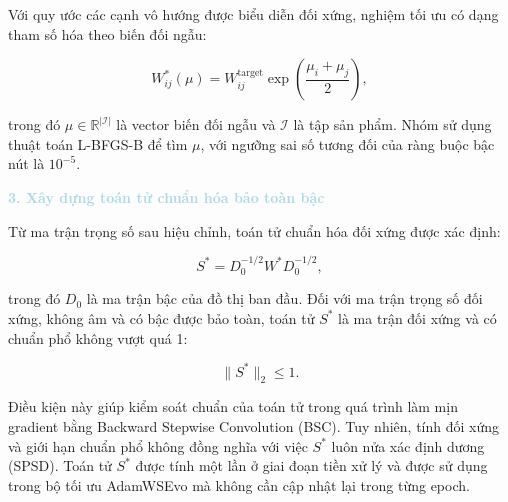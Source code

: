 Với quy ước các cạnh vô hướng được biểu diễn đối xứng, nghiệm tối ưu có dạng tham số hóa theo biến đối ngẫu:

\begin{equation}
W_{ij}^{*}(\mu)
=
W_{ij}^{\mathrm{target}}
\exp\left(\frac{\mu_i+\mu_j}{2}\right),
\end{equation}

trong đó $\mu\in\mathbb{R}^{|\mathcal{I}|}$ là vector biến đối ngẫu và $\mathcal{I}$ là tập sản phẩm. Nhóm sử dụng thuật toán L-BFGS-B để tìm $\mu$, với ngưỡng sai số tương đối của ràng buộc bậc nút là $10^{-5}$.

\noindent\textcolor{lightblue}{\textbf{3. Xây dựng toán tử chuẩn hóa bảo toàn bậc}}

Từ ma trận trọng số sau hiệu chỉnh, toán tử chuẩn hóa đối xứng được xác định:

\begin{equation}
S^{*}=D_0^{-1/2}W^{*}D_0^{-1/2},
\end{equation}

trong đó $D_0$ là ma trận bậc của đồ thị ban đầu. Đối với ma trận trọng số đối xứng, không âm và có bậc được bảo toàn, toán tử $S^{*}$ là ma trận đối xứng và có chuẩn phổ không vượt quá 1:

\begin{equation}
\lVert S^{*}\rVert_2\leq 1.
\end{equation}

Điều kiện này giúp kiểm soát chuẩn của toán tử trong quá trình làm mịn gradient bằng Backward Stepwise Convolution (BSC). Tuy nhiên, tính đối xứng và giới hạn chuẩn phổ không đồng nghĩa với việc $S^{*}$ luôn nửa xác định dương (SPSD). Toán tử $S^{*}$ được tính một lần ở giai đoạn tiền xử lý và được sử dụng trong bộ tối ưu AdamWSEvo mà không cần cập nhật lại trong từng epoch.


